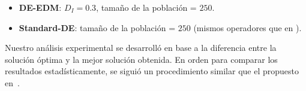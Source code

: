 \begin{itemize}
\item \textbf{ DE-EDM}: $D_I = 0.3$, tamaño de la población = $250$.
\item \textbf{ Standard-DE}: tamaño de la población = $250$ (mismos operadores que en \DEEDM{}).
\end{itemize}
%

Nuestro análisis experimental se desarrolló en base a la diferencia entre la solución óptima y la mejor solución obtenida.
%
En orden para comparar los resultados estadísticamente, se siguió un procedimiento similar que el propuesto en~\cite{Joel:StatisticalTest}.

